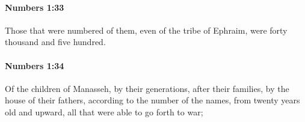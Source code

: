 		\paragraph{Numbers 1:33} %
			\label{NUMBERS-1-33}

			Those that were numbered of them, even of the tribe of Ephraim, were forty thousand and five hundred.


		\paragraph{Numbers 1:34} %
			\label{NUMBERS-1-34}

			Of the children of Manasseh, by their generations, after their families, by the house of their fathers, according to the number of the names, from twenty years old and upward, all that were able to go forth to war;


